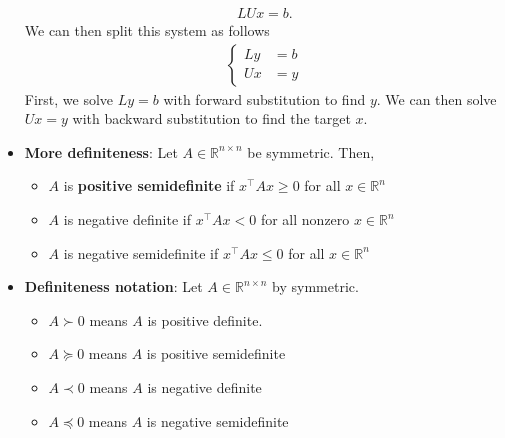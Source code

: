 \documentclass{report}
\begin{document}
\begin{itemize}
            \begin{align*}
                LUx = b
            .\end{align*}
            We can then split this system as follows
            \begin{align*}
                \begin{cases}
                    Ly &= b \\
                    Ux &= y
                \end{cases}
            \end{align*}
            First, we solve $Ly = b$ with forward substitution to find $y$. We can then solve $Ux = y$ with backward substitution to find the target $x$.
        \item \textbf{More definiteness}: Let $A \in \mathbb{R}^{n\times n}$ be symmetric. Then,
            \begin{itemize}
                \item $A$ is \textbf{positive semidefinite} if $x^{\top}Ax \geq 0 $ for all $x\in \mathbb{R}^{n} $
                \item $A$ is negative definite if $x^{\top}Ax < 0 $ for all nonzero $x\in \mathbb{R}^{n}$
                \item $A$ is negative semidefinite if $x^{\top}Ax \leq 0$ for all $x\in \mathbb{R}^{n} $
            \end{itemize}
        \item \textbf{Definiteness notation}: Let $A\in \mathbb{R}^{n\times n}$ by symmetric.
            \begin{itemize}
                \item $A \succ 0$ means $A$ is positive definite.        
                \item $A \succeq 0$ means $A$ is positive semidefinite
                \item $A \prec 0$ means $A$ is negative definite
                \item $A \preceq 0$ means $A$ is negative semidefinite
            \end{itemize}


\end{itemize}
\end{document}
